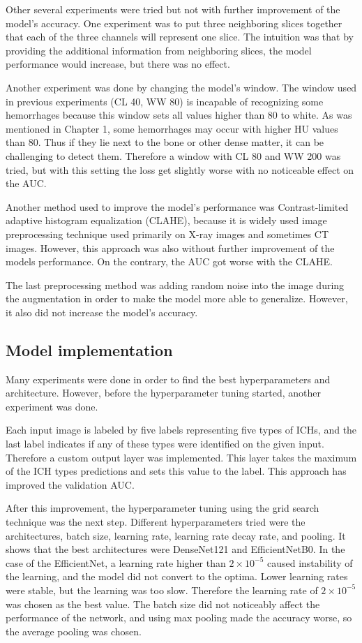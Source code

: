 \documentclass[thesis=B,english]{FITthesis}[2019/12/23]
\begin{document}
Other several experiments were tried but not with further improvement of the model's accuracy. One experiment was to put three neighboring slices together that each of the three channels will represent one slice. The intuition was that by providing the additional information from neighboring slices, the model performance would increase, but there was no effect. 

Another experiment was done by changing the model's window. The window used in previous experiments (CL 40, WW 80) is incapable of recognizing some hemorrhages because this window sets all values higher than 80 to white. As was mentioned in Chapter 1, some hemorrhages may occur with higher HU values than 80. Thus if they lie next to the bone or other dense matter, it can be challenging to detect them. Therefore a window with CL 80 and WW 200 was tried, but with this setting the loss get slightly worse with no noticeable effect on the AUC.

Another method used to improve the model's performance was Contrast-limited adaptive histogram equalization (CLAHE), because it is widely used image preprocessing technique used primarily on X-ray images and sometimes CT images. However, this approach was also without further improvement of the models performance. On the contrary, the AUC got worse with the CLAHE.

The last preprocessing method was adding random noise into the image during the augmentation in order to make the model more able to generalize. However, it also did not increase the model's accuracy.

\subsection{Model implementation}
Many experiments were done in order to find the best hyperparameters and architecture. However, before the hyperparameter tuning started, another experiment was done.

Each input image is labeled by five labels representing five types of ICHs, and the last label indicates if any of these types were identified on the given input. Therefore a custom output layer was implemented. This layer takes the maximum of the ICH types predictions and sets this value to the  label. This approach has improved the validation AUC.

After this improvement, the hyperparameter tuning using the grid search technique was the next step. Different hyperparameters tried were the architectures, batch size, learning rate, learning rate decay rate, and pooling. It shows that the best architectures were DenseNet121 and EfficientNetB0. In the case of the EfficientNet, a learning rate higher than $2\times10^{-5}$ caused instability of the learning, and the model did not convert to the optima. Lower learning rates were stable, but the learning was too slow. Therefore the learning rate of $2\times10^{-5}$ was chosen as the best value. The batch size did not noticeably affect the performance of the network, and using max pooling made the accuracy worse, so the average pooling was chosen.
\end{document}

